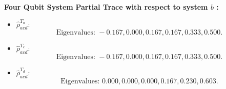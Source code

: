 \documentclass[usenames,dvipsnames]{beamer}
\begin{document}
		\begin{frame}{\textbf{Four Qubit System}}
		\textbf{Partial Trace with respect to system $b$ :}
		\begin{itemize}
			\item {}$\hat{\rho}_{acd}^{T_a}$:
			\begin{equation*}
				\text{Eigenvalues: }-0.167, 0.000, 0.167, 0.167, 0.333, 0.500.
			\end{equation*}
			\item {}$\hat{\rho}_{acd}^{T_c}$:
			\begin{equation*}
				\text{Eigenvalues: }-0.167, 0.000, 0.167, 0.167, 0.333, 0.500.
			\end{equation*}
			\item {}$\hat{\rho}_{acd}^{T_d}$:
			\begin{equation*}
				\text{Eigenvalues: }0.000, 0.000, 0.000, 0.167, 0.230, 0.603.
			\end{equation*}
		\end{itemize}
		\end{frame}
		
\end{document}
